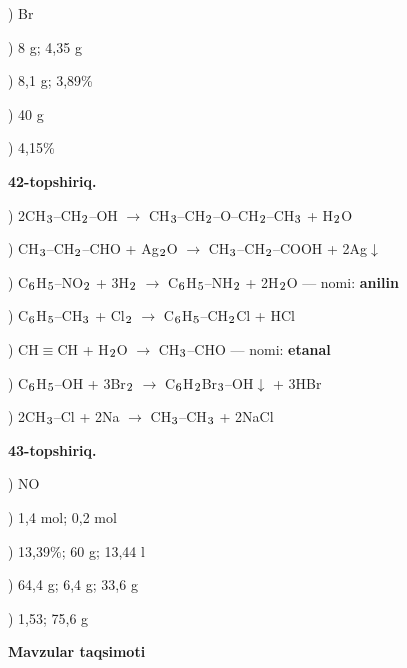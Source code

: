 \documentclass[11pt,a4paper]{article}
\renewcommand{\textsubscript}[1]{\ensuremath{_{\text{\fontsize{8}{8}\selectfont #1}}}}
\begin{document}
) Br\par
{}) 8 g; 4,35 g\par
{}) 8,1 g; 3,89\%\par
{}) 40 g\par
{}) 4,15\%\par
\noindent\textbf{42-topshiriq.}\par
{}) 2CH\textsubscript{3}--CH\textsubscript{2}--OH $\to$ CH\textsubscript{3}--CH\textsubscript{2}--O--CH\textsubscript{2}--CH\textsubscript{3} + H\textsubscript{2}O\par
{}) CH\textsubscript{3}--CH\textsubscript{2}--CHO + Ag\textsubscript{2}O $\to$ CH\textsubscript{3}--CH\textsubscript{2}--COOH + 2Ag$\downarrow$\par
{}) C\textsubscript{6}H\textsubscript{5}--NO\textsubscript{2} + 3H\textsubscript{2} $\to$ C\textsubscript{6}H\textsubscript{5}--NH\textsubscript{2} + 2H\textsubscript{2}O --- nomi: \textbf{anilin}\par
{}) C\textsubscript{6}H\textsubscript{5}--CH\textsubscript{3} + Cl\textsubscript{2} $\to$ C\textsubscript{6}H\textsubscript{5}--CH\textsubscript{2}Cl + HCl\par
{}) CH$\equiv$CH + H\textsubscript{2}O $\to$ CH\textsubscript{3}--CHO --- nomi: \textbf{etanal}\par
{}) C\textsubscript{6}H\textsubscript{5}--OH + 3Br\textsubscript{2} $\to$ C\textsubscript{6}H\textsubscript{2}Br\textsubscript{3}--OH$\downarrow$ + 3HBr\par
{}) 2CH\textsubscript{3}--Cl + 2Na $\to$ CH\textsubscript{3}--CH\textsubscript{3} + 2NaCl\par
\noindent\textbf{43-topshiriq.}\par
{}) NO\par
{}) 1,4 mol; 0,2 mol\par
{}) 13,39\%; 60 g; 13,44 l\par
{}) 64,4 g; 6,4 g; 33,6 g\par
{}) 1,53; 75,6 g\par
\par\bigskip\noindent\textbf{Mavzular taqsimoti}\par\smallskip
\end{document}
